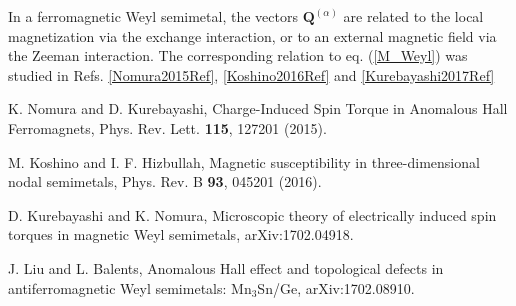 \documentclass[letter,twocolumn,amsmath,amssymb,superscriptaddress]{jpsj3}
\newcommand{\vQ}{\bm{Q}}
\begin{document}
\begin{thebibliography}{99}
In a ferromagnetic Weyl semimetal, the vectors $\vQ^{(\alpha)}$ are related to the local magnetization via the exchange interaction, or to an external magnetic field via the Zeeman interaction. 
The corresponding relation to eq. (\ref{M_Weyl}) was studied
in Refs. \ref{Nomura2015Ref}, \ref{Koshino2016Ref} and \ref{Kurebayashi2017Ref}

K. Nomura and D. Kurebayashi, 
Charge-Induced Spin Torque in Anomalous Hall Ferromagnets,
Phys. Rev. Lett. {\bf 115}, 127201 (2015).
\label{Nomura2015Ref}

M. Koshino and I. F. Hizbullah,
Magnetic susceptibility in three-dimensional nodal semimetals,
Phys. Rev. B {\bf 93}, 045201 (2016).
\label{Koshino2016Ref}

D. Kurebayashi and K. Nomura,
Microscopic theory of electrically induced spin torques in magnetic Weyl semimetals,
arXiv:1702.04918.
\label{Kurebayashi2017Ref}

J. Liu and L. Balents,
Anomalous Hall effect and topological defects in antiferromagnetic Weyl semimetals: Mn$_3$Sn/Ge,
arXiv:1702.08910.
\label{Li2017Ref}

\end{thebibliography}
\end{document}
